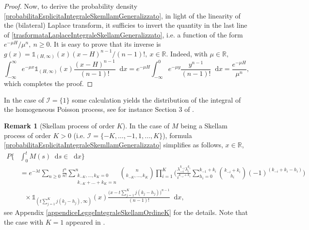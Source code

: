 \documentclass[12pt, twoside, english, headsepline]{article}
\newcommand*\dif{\mathop{}\!\mathrm{d}}  %
\theoremstyle{definition} %
\newtheorem{remark}{Remark}[section] %
\numberwithin{equation}{section} %
\begin{document}
\begin{proof}
Now, to derive the probability density \eqref{probabilitaEsplicitaIntegraleSkemllamGeneralizzato}, in light of the linearity of the (bilateral) Laplace transform, it sufficies to invert the quantity in the last line of \eqref{trasformataLaplaceIntegraleSkellamGeneralizzato}, i.e. a function of the form $e^{-\mu H}/\mu^n, \ n\ge0$. It is easy to prove that its inverse is $g(x) = \mathds{1}_{(H,\infty)}(x) (x-H)^{n-1}/(n-1)!, \ x\in\mathbb{R}$. Indeed, with $\mu\in\mathbb{R},$
\begin{equation}\label{trasformazioneLaplaceFunzionePerLeggeEsplicitaSkellam}
	\int_{-\infty}^\infty e^{-\mu x} \mathds{1}_{(H,\infty)}(x) \frac{(x-H)^{n-1}}{(n-1)!}\dif x = e^{-\mu H}	\int_{-\infty}^0 e^{-\mu y} \frac{y^{n-1}}{(n-1)!}\dif x = \frac{e^{-\mu H}}{\mu^n},
\end{equation}
which completes the proof.
\end{proof}

In the case of $\mathcal{I} = \{1\}$ some calculation yields the distribution of the integral of the homogeneous Poisson process, see for instance Section 3 of \cite{SVw2007}. %

\begin{remark}[Skellam process of order $K$]
In the case of $M$ being a Skellam process of order $K>0$ (i.e. $\mathcal{I} = \{-K,\dots,-1,1,\dots,K\}$), formula \eqref{probabilitaEsplicitaIntegraleSkemllamGeneralizzato} simplifies as follows, $x\in\mathbb{R}$,
\begin{align}
	P\bigg\{&\int_0^t M(s)\dif s\in \dif x\bigg\} \nonumber\\
	&=  e^{-\lambda t} \sum_{n\ge0} \frac{t^n}{n!} \sum_{\substack{k_{-K},\dots,k_K=0\\k_{-K}+\dots+k_K = n}}^n \binom{n}{k_{-K},\dots, k_{K}} \prod_{i=1}^K \Bigg( \frac{\lambda_{-i}^{k_{-i}} \lambda_{i}^{k_i}}{i^{k_{-i}+k_i}} \sum_{h_i = 0}^{k_{-1}+k_i} \binom{k_{-i}+k_i}{h_i} (-1)^{(k_{-i}+k_i-h_i)} \Bigg)\nonumber \\
	&\ \ \ \times\mathds{1}_{(t\sum_{j=1}^K j(k_j-h_j) ,\infty)}(x) \frac{\big(x-t\sum_{j=1}^K j(k_j-h_j)\big)^{n-1}}{(n-1)!}\dif x, \label{probabilitaEsplicitaIntegraleSkemllamOrdineK}
\end{align}
see Appendix \ref{appendiceLeggeIntegraleSkellamOrdineK} for the details. Note that the case with $K=1$ appeared in \cite{X2018}.
\end{remark}
\end{document}
